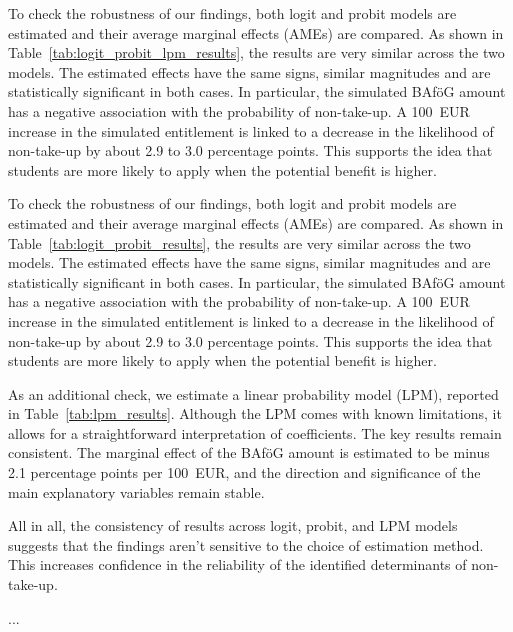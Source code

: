 To check the robustness of our findings, both logit and probit models are estimated and their average marginal effects (AMEs) are compared. 
As shown in Table~\ref{tab:logit_probit_lpm_results}, the results are very similar across the two models. 
The estimated effects have the same signs, similar magnitudes and are statistically significant in both cases. 
In particular, the simulated BAföG amount has a negative association with the probability of non-take-up. 
A 100~EUR increase in the simulated entitlement is linked to a decrease in the likelihood of non-take-up by about 2.9 to 3.0 percentage points. 
This supports the idea that students are more likely to apply when the potential benefit is higher.

To check the robustness of our findings, both logit and probit models are estimated and their average marginal effects (AMEs) are compared. As shown in Table~\ref{tab:logit_probit_results}, the results are very similar across the two models. The estimated effects have the same signs, similar magnitudes and are statistically significant in both cases. In particular, the simulated BAföG amount has a negative association with the probability of non-take-up. A 100~EUR increase in the simulated entitlement is linked to a decrease in the likelihood of non-take-up by about 2.9 to 3.0 percentage points. This supports the idea that students are more likely to apply when the potential benefit is higher.

As an additional check, we estimate a linear probability model (LPM), reported in Table~\ref{tab:lpm_results}. Although the LPM comes with known limitations, it allows for a straightforward interpretation of coefficients. The key results remain consistent. The marginal effect of the BAföG amount is estimated to be minus 2.1 percentage points per 100~EUR, and the direction and significance of the main explanatory variables remain stable.

All in all, the consistency of results across logit, probit, and LPM models suggests that the findings aren't sensitive to the choice of estimation method. This increases confidence in the reliability of the identified determinants of non-take-up.

...

